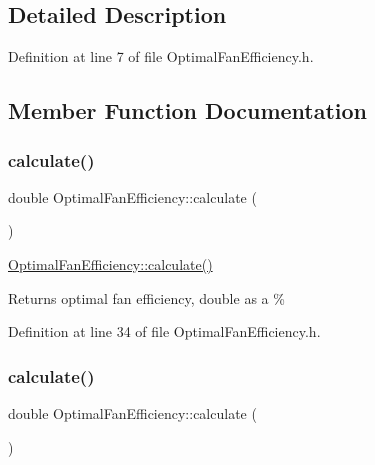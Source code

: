 \subsection{Detailed Description}


Definition at line 7 of file Optimal\+Fan\+Efficiency.\+h.



\subsection{Member Function Documentation}
\mbox{\label{class_optimal_fan_efficiency_ac35291d1095c74373393ac510e45ae02}} 
\subsubsection{\texorpdfstring{calculate()}{calculate()}\hspace{0.1cm}{\footnotesize\ttfamily [1/3]}}
{\footnotesize\ttfamily double Optimal\+Fan\+Efficiency\+::calculate (\begin{DoxyParamCaption}{ }\end{DoxyParamCaption})\hspace{0.3cm}{\ttfamily [inline]}}

\hyperlink{class_optimal_fan_efficiency_ac35291d1095c74373393ac510e45ae02}{Optimal\+Fan\+Efficiency\+::calculate()} \begin{DoxyReturn}{Returns}
optimal fan efficiency, double as a \% 
\end{DoxyReturn}


Definition at line 34 of file Optimal\+Fan\+Efficiency.\+h.

\mbox{\label{class_optimal_fan_efficiency_ac35291d1095c74373393ac510e45ae02}} 
\subsubsection{\texorpdfstring{calculate()}{calculate()}\hspace{0.1cm}{\footnotesize\ttfamily [2/3]}}
{\footnotesize\ttfamily double Optimal\+Fan\+Efficiency\+::calculate (\begin{DoxyParamCaption}{ }\end{DoxyParamCaption})\hspace{0.3cm}{\ttfamily [inline]}}


